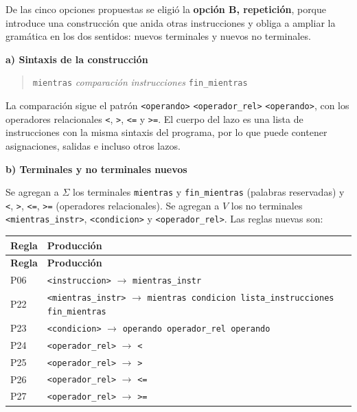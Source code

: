\documentclass[11pt,letterpaper]{article}
\newcommand{\apartado}[1]{\par\Needspace{4\baselineskip}\medskip\noindent\textbf{#1}\par\nobreak\smallskip}
\newcommand{\nt}[1]{\texttt{\textless #1\textgreater}}
\newcommand{\regla}[2]{\nt{#1} $\rightarrow$ \texttt{#2}}
\begin{document}
De las cinco opciones propuestas se eligió la \textbf{opción B, repetición}, porque introduce una
construcción que anida otras instrucciones y obliga a ampliar la gramática en los dos sentidos:
nuevos terminales y nuevos no terminales.

\apartado{a) Sintaxis de la construcción}

\begin{quote}
\texttt{mientras} \textit{comparación} \textit{instrucciones} \texttt{fin\_mientras}
\end{quote}

La comparación sigue el patrón \nt{operando} \nt{operador\_rel} \nt{operando}, con los operadores
relacionales \texttt{<}, \texttt{>}, \texttt{\textless=} y \texttt{\textgreater=}. El cuerpo del
lazo es una lista de instrucciones con la misma sintaxis del programa, por lo que puede contener
asignaciones, salidas e incluso otros lazos.

\apartado{b) Terminales y no terminales nuevos}

Se agregan a $\Sigma$ los terminales \texttt{mientras} y \texttt{fin\_mientras} (palabras
reservadas) y \texttt{<}, \texttt{>}, \texttt{\textless=}, \texttt{\textgreater=} (operadores
relacionales). Se agregan a $V$ los no terminales \nt{mientras\_instr}, \nt{condicion} y
\nt{operador\_rel}. Las reglas nuevas son:

\begin{longtable}{|L{1.1cm}|L{\dimexpr\textwidth-1.1cm-4\arrayrulewidth\relax}|}
\hline
{}\textbf{Regla} & \textbf{Producción}\\\hline
\endfirsthead
\hline
{}\textbf{Regla} & \textbf{Producción}\\\hline
\endhead

P06 & \regla{instruccion}{mientras\_instr}\\\hline
P22 & \regla{mientras\_instr}{mientras condicion lista\_instrucciones fin\_mientras}\\\hline
P23 & \regla{condicion}{operando operador\_rel operando}\\\hline
P24 & \regla{operador\_rel}{<}\\\hline
P25 & \regla{operador\_rel}{>}\\\hline
P26 & \regla{operador\_rel}{\textless=}\\\hline
P27 & \regla{operador\_rel}{\textgreater=}\\\hline
\end{longtable}
\end{document}
